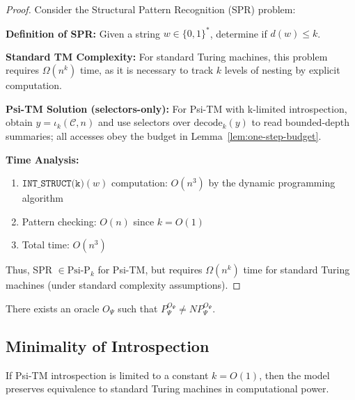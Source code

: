 \begin{proof}
Consider the Structural Pattern Recognition (SPR) problem:

\textbf{Definition of SPR:} 
Given a string $w \in \{0,1\}^*$, determine if $d(w) \leq k$.

\textbf{Standard TM Complexity:}
For standard Turing machines, this problem requires $\Omega(n^k)$ time, as it is necessary to track $k$ levels of nesting by explicit computation.

\textbf{Psi-TM Solution (selectors-only):}
For Psi-TM with k-limited introspection, obtain $y=\iota_k(\mathcal{C},n)$ and use selectors over $\mathrm{decode}_k(y)$ to read bounded-depth summaries; all accesses obey the budget in Lemma~\ref{lem:one-step-budget}.

\textbf{Time Analysis:}
\begin{enumerate}
\item $\texttt{INT\_STRUCT(k)}(w)$ computation: $O(n^3)$ by the dynamic programming algorithm
\item Pattern checking: $O(n)$ since $k = O(1)$
\item Total time: $O(n^3)$
\end{enumerate}

Thus, SPR $\in \text{Psi-P}_k$ for Psi-TM, but requires $\Omega(n^k)$ time for standard Turing machines (under standard complexity assumptions).
\end{proof}

\begin{theorem}
\label{thm:diagonal-1}
There exists an oracle $O_\Psi$ such that $P^{O_\Psi}_\Psi \neq NP^{O_\Psi}_\Psi$.
\end{theorem}

\subsection{Minimality of Introspection}

\begin{theorem}
If Psi-TM introspection is limited to a constant $k = O(1)$, then the model preserves equivalence to standard Turing machines in computational power.
\end{theorem}

